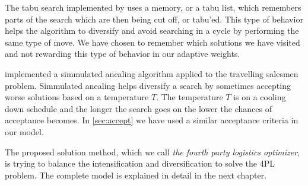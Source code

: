 \documentclass[../main.tex]{subfiles}
\begin{document}
The tabu search implemented by \cite{glover86} uses a memory, or a tabu list, which remembers parts of the search which are then being cut off, or tabu'ed.
This type of behavior helps the algorithm to diversify and avoid searching in a cycle by performing the same type of move. 
We have chosen to remember which solutions we have visited and not rewarding this type of behavior in our adaptive weights. \par

\cite{kirkpatrick83} implemented a simmulated anealing algorithm applied to the travelling salesmen problem. Simmulated anealing helps diversify a search by sometimes accepting worse solutions based on a temperature $T$. 
The temperature $T$ is on a cooling down schedule and the longer the search goes on the lower the chances of acceptance becomes. 
In \cref{sec:accept} we have used a similar acceptance criteria in our model.

The proposed solution method, which we call \textit{the fourth party logistics optimizer}, is trying to balance the intensification and diversification to solve the 4PL problem. The complete model is explained in detail in the next chapter.
\biblio
\end{document}
